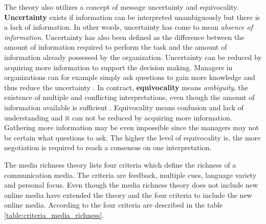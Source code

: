 \documentclass[english,12pt,a4paper,pdftex]{article}
\begin{document}
The theory also utilizes a concept of message uncertainty and equivocality. \textbf{Uncertainty} exists if information can be interpreted unambiguously but there is a lack of information. In other words, uncertainty has come to mean \textit{absence of information}. Uncertainty has also been defined as the difference between the amount of information required to perform the task and the amount of information already possessed by the organization. Uncertainty can be reduced by acquiring more information to support the decision making. Managers in organizations can for example simply ask questions to gain more knowledge and thus reduce the uncertainty \citep{daft1987}. In contract, \textbf{equivocality} means \textit{ambiguity}, the existence of multiple and conflicting interpretations, even though the amount of information available is sufficient \citep{daft1987}. Equivocality means confusion and lack of understanding and it can not be reduced by acquiring more information. Gathering more information may be even impossible since the managers may not be certain what questions to ask. The higher the level of equivocality is, the more negotiation is required to reach a consensus on one interpretation.

The media richness theory lists four criteria which define the richness of a communication media. The criteria are feedback, multiple cues, language variety and personal focus. Even though the media richness theory does not include new online media \citet{graveline2000} have extended the theory and the four criteria to include the new online media. According to \citet{graveline2000} the four criteria are described in the table \ref{table:criteria_media_richness}.
\end{document}
